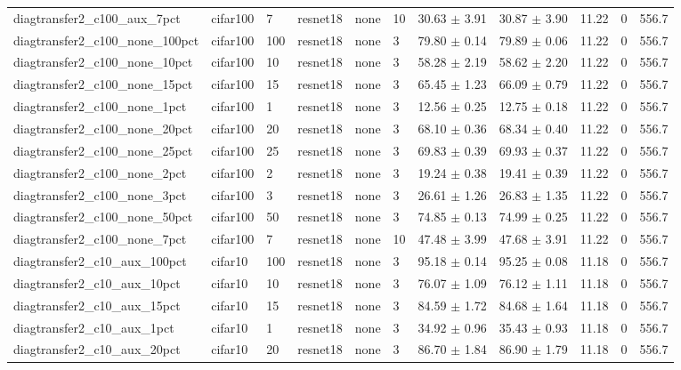 \begin{tabular}{lllllllllll}
diagtransfer2_c100_aux_7pct & cifar100 & 7 & resnet18 & none & 10 & 30.63 $\pm$ 3.91 & 30.87 $\pm$ 3.90 & 11.22 & 0 & 556.7 \\
diagtransfer2_c100_none_100pct & cifar100 & 100 & resnet18 & none & 3 & 79.80 $\pm$ 0.14 & 79.89 $\pm$ 0.06 & 11.22 & 0 & 556.7 \\
diagtransfer2_c100_none_10pct & cifar100 & 10 & resnet18 & none & 3 & 58.28 $\pm$ 2.19 & 58.62 $\pm$ 2.20 & 11.22 & 0 & 556.7 \\
diagtransfer2_c100_none_15pct & cifar100 & 15 & resnet18 & none & 3 & 65.45 $\pm$ 1.23 & 66.09 $\pm$ 0.79 & 11.22 & 0 & 556.7 \\
diagtransfer2_c100_none_1pct & cifar100 & 1 & resnet18 & none & 3 & 12.56 $\pm$ 0.25 & 12.75 $\pm$ 0.18 & 11.22 & 0 & 556.7 \\
diagtransfer2_c100_none_20pct & cifar100 & 20 & resnet18 & none & 3 & 68.10 $\pm$ 0.36 & 68.34 $\pm$ 0.40 & 11.22 & 0 & 556.7 \\
diagtransfer2_c100_none_25pct & cifar100 & 25 & resnet18 & none & 3 & 69.83 $\pm$ 0.39 & 69.93 $\pm$ 0.37 & 11.22 & 0 & 556.7 \\
diagtransfer2_c100_none_2pct & cifar100 & 2 & resnet18 & none & 3 & 19.24 $\pm$ 0.38 & 19.41 $\pm$ 0.39 & 11.22 & 0 & 556.7 \\
diagtransfer2_c100_none_3pct & cifar100 & 3 & resnet18 & none & 3 & 26.61 $\pm$ 1.26 & 26.83 $\pm$ 1.35 & 11.22 & 0 & 556.7 \\
diagtransfer2_c100_none_50pct & cifar100 & 50 & resnet18 & none & 3 & 74.85 $\pm$ 0.13 & 74.99 $\pm$ 0.25 & 11.22 & 0 & 556.7 \\
diagtransfer2_c100_none_7pct & cifar100 & 7 & resnet18 & none & 10 & 47.48 $\pm$ 3.99 & 47.68 $\pm$ 3.91 & 11.22 & 0 & 556.7 \\
diagtransfer2_c10_aux_100pct & cifar10 & 100 & resnet18 & none & 3 & 95.18 $\pm$ 0.14 & 95.25 $\pm$ 0.08 & 11.18 & 0 & 556.7 \\
diagtransfer2_c10_aux_10pct & cifar10 & 10 & resnet18 & none & 3 & 76.07 $\pm$ 1.09 & 76.12 $\pm$ 1.11 & 11.18 & 0 & 556.7 \\
diagtransfer2_c10_aux_15pct & cifar10 & 15 & resnet18 & none & 3 & 84.59 $\pm$ 1.72 & 84.68 $\pm$ 1.64 & 11.18 & 0 & 556.7 \\
diagtransfer2_c10_aux_1pct & cifar10 & 1 & resnet18 & none & 3 & 34.92 $\pm$ 0.96 & 35.43 $\pm$ 0.93 & 11.18 & 0 & 556.7 \\
diagtransfer2_c10_aux_20pct & cifar10 & 20 & resnet18 & none & 3 & 86.70 $\pm$ 1.84 & 86.90 $\pm$ 1.79 & 11.18 & 0 & 556.7 \\

\end{tabular}
